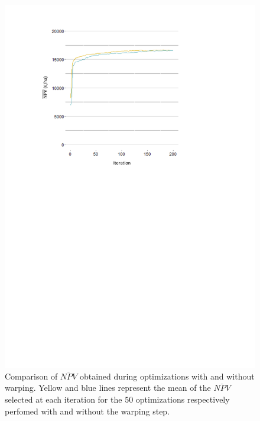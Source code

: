 \begin{figure}[!ht]
	\centering
	\includegraphics[trim = 2cm 15cm 5cm 1cm, clip, width=\textwidth]{Figures_Warping_resultats_courbes_moyennes_mean_NPV_warping_sanswarping.pdf}
	\caption{Comparison of $\overline{NPV}$ obtained during optimizations with and without warping. 
	Yellow and blue lines represent the mean of the $\overline{NPV}$ selected at each iteration for the 50 optimizations respectively perfomed with and without the warping step. }\label{fig:moyennesNPV}
\end{figure}

